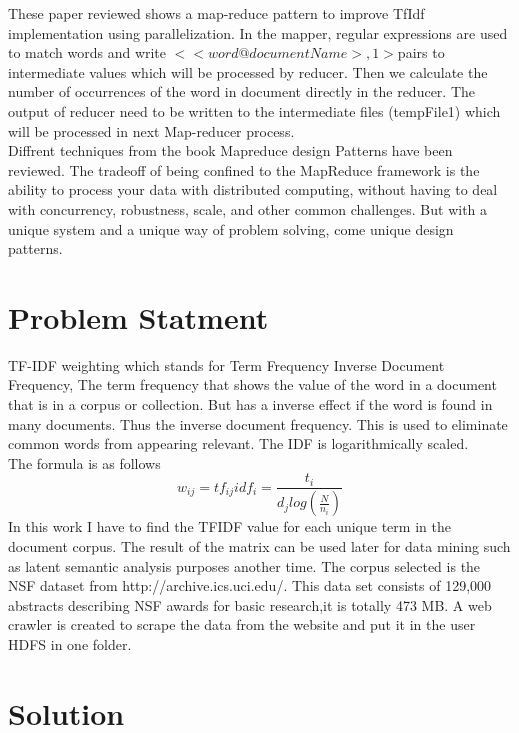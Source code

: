 \documentclass{bigdata}
\begin{document}
These paper reviewed shows a map-reduce pattern to improve TfIdf implementation using parallelization.\cite{a} In the mapper,  regular expressions are used to match words and write $<<word@documentName>, 1> $pairs to intermediate values which will be processed by reducer. Then we calculate the number of occurrences of the word in document directly in the reducer. The output of reducer need to be written to the intermediate files (tempFile1) which will be processed in next Map-reducer process.\\

Diffrent techniques from the book Mapreduce design Patterns \cite{c} have been reviewed. The tradeoff of being confined to the MapReduce framework is the ability to process your data with distributed computing, without having to deal with concurrency, robustness, scale, and other common challenges. But with a unique system and a unique way of problem solving, come unique design patterns.\\
\section{Problem Statment}
\noindent
TF-IDF weighting which stands for Term Frequency Inverse Document Frequency, The term frequency that shows the value of the word in a document that is in a corpus or collection. But has a inverse effect if the word is found in many documents. Thus the inverse document frequency. This is used to eliminate common words from appearing relevant. The IDF is logarithmically scaled.\\
The formula is as follows
\begin{equation}
w_{ij} = tf_{ij} idf_i = \frac{t_i}{d_j log(\frac{N}{n_i})}
\end{equation}
\noindent
In this work I have to find the TFIDF value for each  unique term in the document corpus.  The result of the matrix can be used later for data mining such as latent semantic analysis purposes another time. The corpus selected is the NSF dataset from http://archive.ics.uci.edu/. This data set consists of 129,000 abstracts describing NSF awards for basic research,it is totally 473 MB.  A web crawler is created to scrape the data from the website and put it in the user HDFS in one folder.
\\
\section{Solution}
\noindent
\end{document}
